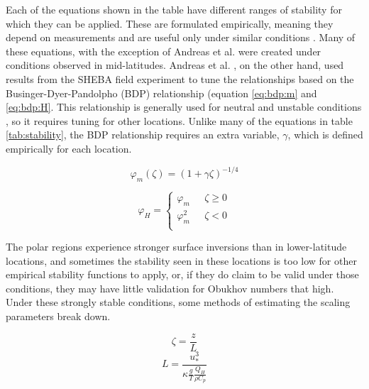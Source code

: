 Each of the equations shown in the table have different ranges of stability for which they can be applied. These are formulated empirically, meaning they depend on measurements and are useful only under similar conditions \cite{stull:} \cite{foken:2008}. Many of these equations, with the exception of Andreas et al. \cite{andreas:2010} were created under conditions observed in mid-latitudes. Andreas et al. \cite{andreas:2010}, on the other hand, used results from the SHEBA field experiment to tune the relationships based on the Businger-Dyer-Pandolpho (BDP) relationship (equation \ref{eq:bdp:m} and \ref{eq:bdp:H}. This relationship is generally used for neutral and unstable conditions \cite{foken:2008}, so it requires tuning for other locations. Unlike many of the equations in table \ref{tab:stability}, the BDP relationship requires an extra variable, $\gamma$, which is defined empirically for each location.

\begin{equation}\label{eq:bdp:m}
\varphi_{m}(\zeta) = (1 + \gamma \zeta)^{-1/4}
\end{equation}

\begin{equation}\label{eq:bdp:H}
\varphi_{H} = \begin{cases} 
\varphi_{m} & \text{    } \zeta \geq 0 \\ 
\varphi_{m}^{2} & \text{    } \zeta < 0 \\ 
\end{cases}
\end{equation}

The polar regions experience stronger surface inversions than in lower-latitude locations, and sometimes the stability seen in these locations is too low for other empirical stability functions to apply, or, if they do claim to be valid under those conditions, they may have little validation for Obukhov numbers that high. Under these strongly stable conditions, some methods of estimating the scaling parameters break down. 

\begin{equation}\label{eq:zl}
\zeta = \frac{z}{L}
\end{equation}
\begin{equation}\label{eq:l}
L = \frac{u_{*}^{3}}{\kappa \frac{g}{T} \frac{Q_{H}}{\rho C_{p}}}
\end{equation}


